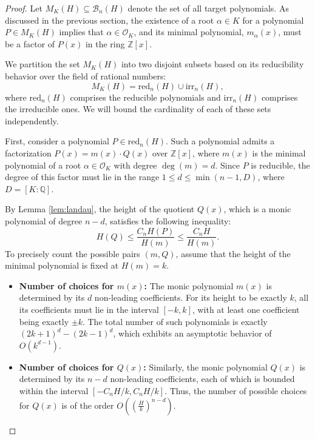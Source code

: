 \documentclass[11pt,a4paper]{article}
\newcommand{\Q}{\mathbb{Q}}
\newcommand{\Z}{\mathbb{Z}}
\newcommand{\OK}{\mathcal{O}_K}
\begin{document}
\begin{proof}
Let $M_K(H) \subseteq \mathcal{B}_n(H)$ denote the set of all target polynomials. As discussed in the previous section, the existence of a root $\alpha \in K$ for a polynomial $P \in M_K(H)$ implies that $\alpha \in \OK$, and its minimal polynomial, $m_\alpha(x)$, must be a factor of $P(x)$ in the ring $\Z[x]$.

We partition the set $M_K(H)$ into two disjoint subsets based on its reducibility behavior over the field of rational numbers:
\begin{equation*}
    M_K(H) = \mathrm{red}_n(H) \cup \mathrm{irr}_n(H),
\end{equation*}
where $\mathrm{red}_n(H)$ comprises the reducible polynomials and $\mathrm{irr}_n(H)$ comprises the irreducible ones. We will bound the cardinality of each of these sets independently.

First, consider a polynomial $P \in \mathrm{red}_n(H)$. Such a polynomial admits a factorization $P(x) = m(x) \cdot Q(x)$ over $\Z[x]$, where $m(x)$ is the minimal polynomial of a root $\alpha \in \OK$ with degree $\deg(m) = d$. Since $P$ is reducible, the degree of this factor must lie in the range $1 \le d \le \min(n-1, D)$, where $D =[K:\Q]$. 

By Lemma \ref{lem:landau}, the height of the quotient $Q(x)$, which is a monic polynomial of degree $n-d$, satisfies the following inequality:
\begin{equation*}
    H(Q) \le \frac{C_n H(P)}{H(m)} \le \frac{C_n H}{H(m)}.
\end{equation*}
To precisely count the possible pairs $(m, Q)$, assume that the height of the minimal polynomial is fixed at $H(m) = k$.
\begin{itemize}
    \item \textbf{Number of choices for $m(x)$:} The monic polynomial $m(x)$ is determined by its $d$ non-leading coefficients. For its height to be exactly $k$, all its coefficients must lie in the interval $[-k, k]$, with at least one coefficient being exactly $\pm k$. The total number of such polynomials is exactly $(2k+1)^d - (2k-1)^d$, which exhibits an asymptotic behavior of $O(k^{d-1})$.
    \item \textbf{Number of choices for $Q(x)$:} Similarly, the monic polynomial $Q(x)$ is determined by its $n-d$ non-leading coefficients, each of which is bounded within the interval $[-C_n H/k, C_n H/k]$. Thus, the number of possible choices for $Q(x)$ is of the order $O\left( \left(\frac{H}{k}\right)^{n-d} \right)$.
\end{itemize}


\end{proof}
\end{document}
